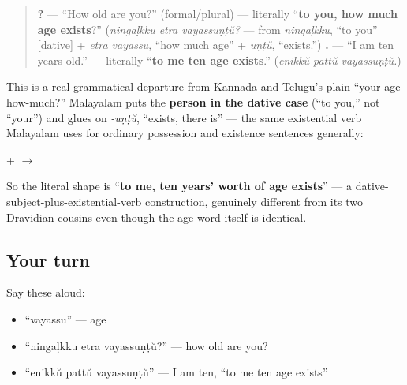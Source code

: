 \begin{grammarlens}[title={Grammar Lens: dative subject + \textquotedblleft{}exists\textquotedblright{}}]
\begin{quote}
\textbf{  ?} — \textquotedblleft{}How old are you?\textquotedblright{} (formal/plural) — literally \textquotedblleft{}\textbf{to you, how much age exists}?\textquotedblright{} (\emph{ningaḷkku etra vayassuṇṭŭ?} — from \emph{ningaḷkku}, \textquotedblleft{}to you\textquotedblright{} {[}dative{]} + \emph{etra vayassu}, \textquotedblleft{}how much age\textquotedblright{} + \emph{uṇṭŭ}, \textquotedblleft{}exists.\textquotedblright{}) \textbf{  .} — \textquotedblleft{}I am ten years old.\textquotedblright{} — literally \textquotedblleft{}\textbf{to me ten age exists}.\textquotedblright{} (\emph{enikkŭ pattŭ vayassuṇṭŭ.})
\end{quote}

This is a real grammatical departure from Kannada and Telugu's plain \textquotedblleft{}your age how-much?\textquotedblright{} Malayalam puts the \textbf{person in the dative case} (\textquotedblleft{}to you,\textquotedblright{} not \textquotedblleft{}your\textquotedblright{}) and glues on \emph{-uṇṭŭ}, \textquotedblleft{}exists, there is\textquotedblright{} — the same existential verb Malayalam uses for ordinary possession and existence sentences generally:

\textbf{} + \textbf{} $\to$ \textbf{}

So the literal shape is \textquotedblleft{}\textbf{to me, ten years' worth of age exists}\textquotedblright{} — a dative-subject-plus-existential-verb construction, genuinely different from its two Dravidian cousins even though the age-word itself is identical.
\end{grammarlens}

\subsection*{Your turn}
Say these aloud:

\begin{itemize}
\raggedright
  \item \textquotedblleft{}vayassu\textquotedblright{} — age
  \item \textquotedblleft{}ningaḷkku etra vayassuṇṭŭ?\textquotedblright{} — how old are you?
  \item \textquotedblleft{}enikkŭ pattŭ vayassuṇṭŭ\textquotedblright{} — I am ten, \textquotedblleft{}to me ten age exists\textquotedblright{}
\end{itemize}

